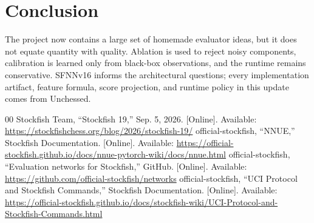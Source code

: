 \documentclass[10pt,conference]{IEEEtran}
\begin{document}
\section{Conclusion}
The project now contains a large set of homemade evaluator ideas, but it does not equate quantity with quality. Ablation is used to reject noisy components, calibration is learned only from black-box observations, and the runtime remains conservative. SFNNv16 informs the architectural questions; every implementation artifact, feature formula, score projection, and runtime policy in this update comes from Unchessed.

\begin{thebibliography}{00}
 Stockfish Team, ``Stockfish 19,'' Sep. 5, 2026. [Online]. Available: \url{https://stockfishchess.org/blog/2026/stockfish-19/}
 official-stockfish, ``NNUE,'' Stockfish Documentation. [Online]. Available: \url{https://official-stockfish.github.io/docs/nnue-pytorch-wiki/docs/nnue.html}
 official-stockfish, ``Evaluation networks for Stockfish,'' GitHub. [Online]. Available: \url{https://github.com/official-stockfish/networks}
 official-stockfish, ``UCI Protocol and Stockfish Commands,'' Stockfish Documentation. [Online]. Available: \url{https://official-stockfish.github.io/docs/stockfish-wiki/UCI-Protocol-and-Stockfish-Commands.html}
\end{thebibliography}
\end{document}
